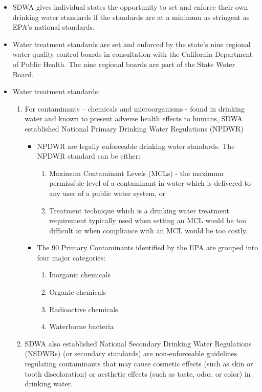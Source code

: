 \documentclass{article}
\begin{document}
\begin{enumerate}
\begin{itemize}
\item SDWA gives individual states the opportunity to set and enforce their own drinking water standards if the standards are at a minimum as stringent as EPA's national standards.\\

\item Water treatment standards are set and enforced by the state’s nine regional water quality control boards in consultation with the California Department of Public Health. The nine regional boards are part of the State Water Board.\\

\item Water treatment standards:
\begin{enumerate}
\item For contaminants – chemicals and microorganisms - found in drinking water and known to present adverse health effects to humans, SDWA established National Primary Drinking Water Regulations (NPDWR)

\begin{itemize}
\item NPDWR are legally enforceable drinking water standards.  The NPDWR standard can be either:
	\begin{enumerate}
	\item Maximum Contaminant Levels (MCLs) - the maximum permissible level of a contaminant in water which is delivered to any user of a public water system,  or 
	\item Treatment technique which is a drinking water treatment requirement typically used when setting an MCL would be too difficult or when compliance with an MCL would be too costly.
	\end{enumerate}

\item The 90 Primary Contaminants identified by the EPA are grouped into four major categories:
\begin{enumerate}
\item Inorganic chemicals
\item Organic chemicals
\item Radioactive chemicals
\item Waterborne bacteria
\end{enumerate}

\end{itemize}

\item SDWA also established National Secondary Drinking Water Regulations (NSDWRs) (or secondary standards) are non-enforceable guidelines regulating contaminants that may cause cosmetic effects (such as skin or tooth discoloration) or aesthetic effects (such as taste, odor, or color) in drinking water.


\end{enumerate}
\end{itemize}
\end{enumerate}
\end{document}
